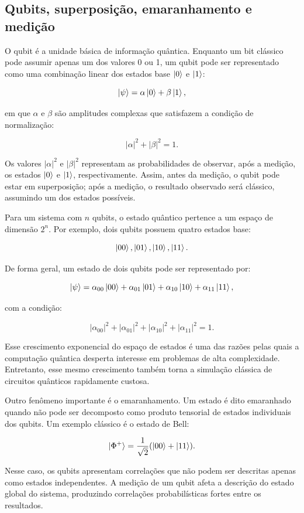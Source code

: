 \documentclass[
    12pt,
    openright,
    oneside,
    a4paper,
    english,
    brazil
]{abntex2}
\begin{document}
\subsection{Qubits, superposição, emaranhamento e medição}

O qubit é a unidade básica de informação quântica. Enquanto um bit clássico pode assumir apenas um dos valores 0 ou 1, um qubit pode ser representado como uma combinação linear dos estados base \(\ket{0}\) e \(\ket{1}\):

\[
\ket{\psi} = \alpha\ket{0} + \beta\ket{1},
\]

em que \(\alpha\) e \(\beta\) são amplitudes complexas que satisfazem a condição de normalização:

\[
|\alpha|^2 + |\beta|^2 = 1.
\]

Os valores \(|\alpha|^2\) e \(|\beta|^2\) representam as probabilidades de observar, após a medição, os estados \(\ket{0}\) e \(\ket{1}\), respectivamente. Assim, antes da medição, o qubit pode estar em superposição; após a medição, o resultado observado será clássico, assumindo um dos estados possíveis.

Para um sistema com \(n\) qubits, o estado quântico pertence a um espaço de dimensão \(2^n\). Por exemplo, dois qubits possuem quatro estados base:

\[
\ket{00}, \ket{01}, \ket{10}, \ket{11}.
\]

De forma geral, um estado de dois qubits pode ser representado por:

\[
\ket{\psi} =
\alpha_{00}\ket{00}
+
\alpha_{01}\ket{01}
+
\alpha_{10}\ket{10}
+
\alpha_{11}\ket{11},
\]

com a condição:

\[
|\alpha_{00}|^2 +
|\alpha_{01}|^2 +
|\alpha_{10}|^2 +
|\alpha_{11}|^2 = 1.
\]

Esse crescimento exponencial do espaço de estados é uma das razões pelas quais a computação quântica desperta interesse em problemas de alta complexidade. Entretanto, esse mesmo crescimento também torna a simulação clássica de circuitos quânticos rapidamente custosa.

Outro fenômeno importante é o emaranhamento. Um estado é dito emaranhado quando não pode ser decomposto como produto tensorial de estados individuais dos qubits. Um exemplo clássico é o estado de Bell:

\[
\ket{\Phi^+} =
\frac{1}{\sqrt{2}}
(\ket{00} + \ket{11}).
\]

Nesse caso, os qubits apresentam correlações que não podem ser descritas apenas como estados independentes. A medição de um qubit afeta a descrição do estado global do sistema, produzindo correlações probabilísticas fortes entre os resultados.
\end{document}
